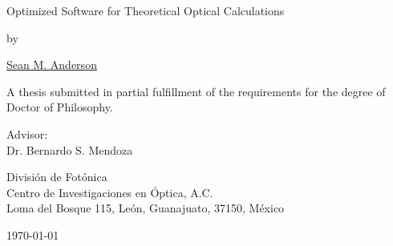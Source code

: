 \begin{titlepage}
\begin{center}
{\Huge Optimized Software for Theoretical Optical Calculations}
\vspace{1.0cm}

{\large by}
\vspace{1.0cm}

{\LARGE \href{mailto:sean.martin.anderson@gmail.com}{Sean M. Anderson}}
\vspace{3cm}

{\Large A thesis submitted in partial fulfillment of the requirements for the
degree of Doctor of Philosophy.}
\vspace{4cm}

{\large Advisor:\\
Dr. Bernardo S. Mendoza
\vspace*{1cm}

Divisi\'on de Fot\'onica\\
Centro de Investigaciones en \'Optica, A.C.\\
Loma del Bosque 115, Le\'on, Guanajuato, 37150, M\'exico}
\vfill
\today
\end{center}
\end{titlepage}
